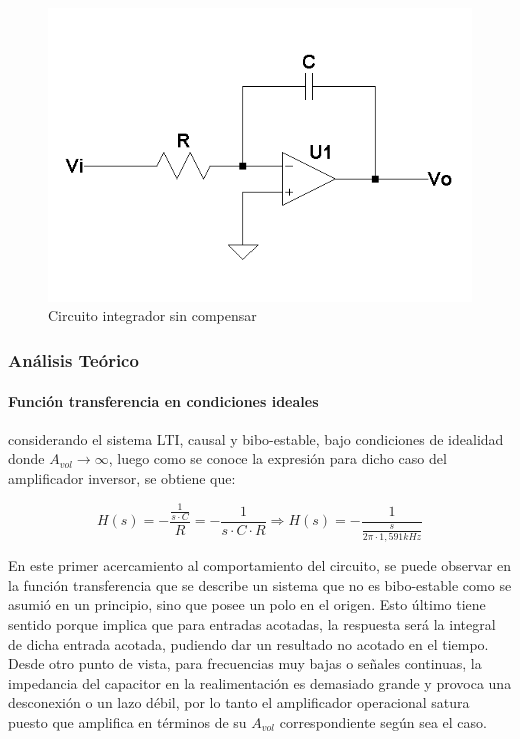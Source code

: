 \begin{figure}[H]
	\centering
	\includegraphics[scale=0.8]{../EJ4/Recursos/Integrador/Circuito_integrador.png}
	\caption{Circuito integrador sin compensar}
	\label{fig:circuito_integrador}
\end{figure}
\subsubsection{An\'alisis Te\'orico}

\paragraph*{Funci\'on transferencia en condiciones ideales} considerando el sistema LTI, causal y bibo-estable, bajo condiciones de idealidad donde $A_{vol} \rightarrow \infty$, luego como se conoce la expresi\'on para dicho caso del amplificador inversor, se obtiene que:

\begin{equation}
	H(s) = - \frac{\frac{1}{s \cdot C}}{R} = - \frac{1}{s \cdot C \cdot R}
	\Rightarrow
	H(s) = - \frac{1}{\frac{s}{2 \pi \cdot 1,591kHz}}
	\label{eq:integrador_transfer_ideal}
\end{equation}

En este primer acercamiento al comportamiento del circuito, se puede observar en la funci\'on transferencia que se describe un sistema que no es bibo-estable como se asumi\'o en un principio, sino que posee un polo en el origen. Esto \'ultimo tiene sentido porque implica que para entradas acotadas, la respuesta ser\'a la integral de dicha entrada acotada, pudiendo dar un resultado no acotado en el tiempo. Desde otro punto de vista, para frecuencias muy bajas o se\~nales continuas, la impedancia del capacitor en la realimentaci\'on es demasiado grande y provoca una desconexi\'on o un lazo d\'ebil, por lo tanto el amplificador operacional satura puesto que amplifica en t\'erminos de su $A_{vol}$ correspondiente seg\'un sea el caso.

